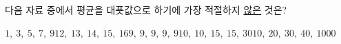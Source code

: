 다음 자료 중에서 평균을 대푯값으로 하기에 가장 적절하지 \underline{않은} 것은?
\begin{choicesii}{$1,\ 3,\ 5,\ 7,\ 9$}{$12,\ 13,\ 14,\ 15,\ 16$}{$9,\ 9,\ 9,\ 9,\ 9$}{$10,\ 10,\ 15,\ 15,\ 30$}{$10,\ 20,\ 30,\ 40,\ 1000$}\end{choicesii}
